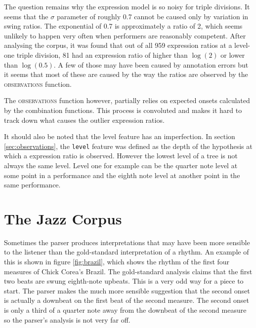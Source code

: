 The question remains why the expression model is so noisy for triple divisions. It seems that the $\sigma$ parameter of roughly 0.7 cannot be caused only by variation in swing ratios. The exponential of 0.7 is approximately a ratio of 2, which seems unlikely to happen very often when performers are reasonably competent. After analysing the corpus, it was found that out of all 959 expression ratios at a level-one triple division, 81 had an expression ratio of higher than $\log(2)$ or lower than $\log(0.5)$. A few of those may have been caused by annotation errors but it seems that most of these are caused by the way the ratios are observed by the \textsc{observations} function.

The \textsc{observations} function however, partially relies on expected onsets calculated by the combination functions. This process is convoluted and makes it hard to track down what causes the outlier expression ratios.

It should also be noted that the level feature has an imperfection. In section \ref{sec:observations}, the \texttt{level} feature was defined as the depth of the hypothesis at which a expression ratio is observed. However the lowest level of a tree is not always the same level. Level one for example can be the quarter note level at some point in a performance and the eighth note level at another point in the same performance. 


\section{The Jazz Corpus}

Sometimes the parser produces interpretations that may have been more sensible to the listener than the gold-standard interpretation of a rhythm. An example of this is shown in figure \ref{fig:brazil}, which shows the rhythm of the first four measures of Chick Corea's Brazil. The gold-standard analysis claims that the first two beats are swung eighth-note upbeats. This is a very odd way for a piece to start. The parser makes the much more sensible suggestion that the second onset is actually a downbeat on the first beat of the second measure. The second onset is only a third of a quarter note away from the downbeat of the second measure so the parser's analysis is not very far off. 

